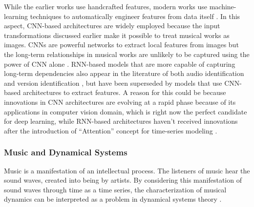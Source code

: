 \documentclass[../main.tex]{subfiles}
\begin{document}
\par
While the earlier works use handcrafted features, modern works use machine-learning techniques to automatically engineer features from data itself \cite{arcas_now_2017,yuTemporalPyramidPooling2019,baez_suarez_unsupervised_2020,yu_contrastive_2020,dorasCoverDetectionUsing2019,jiang_yang_chen_2020,yesilerAccurateScalableVersion2020,yesilerLessMoreFaster2020,yeSupervisedDeepHashing2019b,yuTemporalPyramidPooling2019}. In this aspect, \gls{CNN}-based architectures are widely employed because the input transformations discussed earlier make it possible to treat musical works as images. \gls{CNN}s are powerful networks to extract local features from images but the long-term relationships in musical works are unlikely to be captured using the power of \gls{CNN} alone \cite{yesilerAccurateScalableVersion2020}. \gls{RNN}-based models that are more capable of capturing long-term dependencies also appear in the literature of both audio identification \cite{baez_suarez_unsupervised_2020} and version identification \cite{yeSupervisedDeepHashing2019b}, but have been superseded by models that use \gls{CNN}-based architectures to extract features. A reason for this could be because innovations in \gls{CNN} architectures are evolving at a rapid phase because of its applications in computer vision domain, which is right now the perfect candidate for deep learning, while \gls{RNN}-based architectures haven't received innovations after the introduction of “Attention” concept for time-series modeling \cite{vaswaniAttentionAllYou2017}.

\subsubsection{Music and Dynamical Systems}

\par
Music is a manifestation of an intellectual process. The listeners of music hear the sound waves, created into being by artists. By considering this manifestation of sound waves through time as a time series, the characterization of musical dynamics can be interpreted as a problem in dynamical systems theory \cite{complex_dynamics}. 
\end{document}
